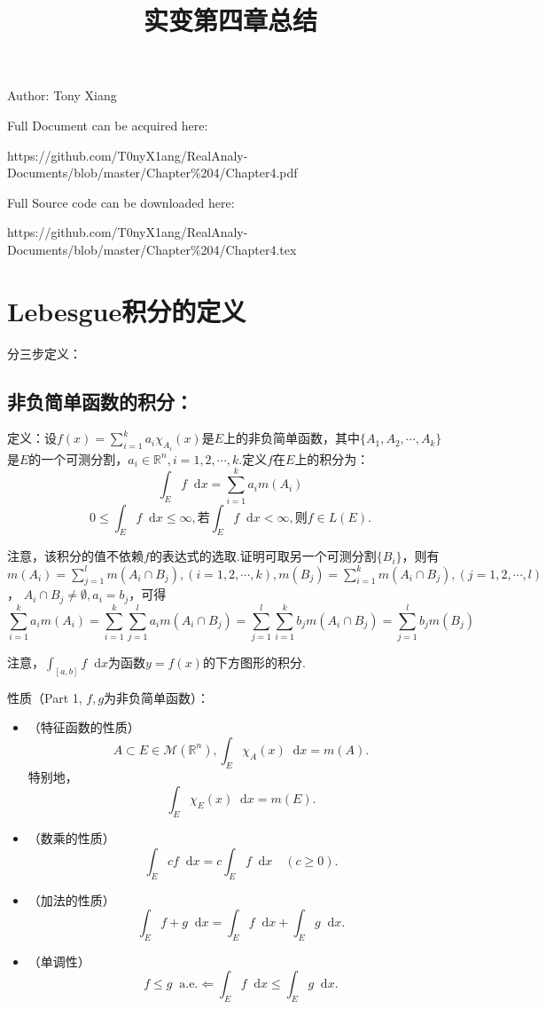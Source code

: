 \documentclass[bwprint, withoutpreface]{cumcmthesis}
\title{实变第四章总结}
\newcommand*{\dif}{\mathop{}\!\mathrm{d}}
\begin{document}
\maketitle
\noindent Author: Tony Xiang

\noindent Full Document can be acquired here: 

\noindent https://github.com/T0nyX1ang/RealAnaly-Documents/blob/master/Chapter\%204/Chapter4.pdf

\noindent Full Source code can be downloaded here:

\noindent https://github.com/T0nyX1ang/RealAnaly-Documents/blob/master/Chapter\%204/Chapter4.tex

\section{Lebesgue积分的定义}
分三步定义：
\subsection{非负简单函数的积分：}
\indent 定义：设$f(x) = \sum_{i = 1}^{k}{a_i\chi_{A_i}(x)}$是$E$上的非负简单函数，其中$\{A_1, A_2, \cdots, A_k\}$是$E$的一个可测分割，$a_i \in \mathbb{R}^n, i = 1, 2, \cdots, k$.定义$f$在$E$上的积分为：
\begin{equation*}
	\int_E{f} \dif x = \sum_{i = 1}^{k}{a_i m(A_i)}
\end{equation*}
\begin{equation*}
	0 \leqslant \int_E{f} \dif x \leqslant \infty, \mbox{若} \int_E{f} \dif x < \infty, \mbox{则}f \in L(E).
\end{equation*}

注意，该积分的值不依赖$f$的表达式的选取.证明可取另一个可测分割$\{B_i\}$，则有$m(A_i) = \sum_{j = 1}^{l}{m(A_i \cap B_j)}, (i = 1, 2, \cdots, k), m(B_j) = \sum_{i = 1}^{k}{m(A_i \cap B_j)}, (j = 1, 2, \cdots, l)$， $A_i \cap B_j \neq \emptyset, a_i = b_j$，可得 \[ \sum_{i = 1}^{k} a_i m(A_i) = \sum_{i = 1}^{k}{\sum_{j = 1}^{l}{a_i m(A_i \cap B_j)}} = \sum_{j = 1}^{l}{\sum_{i = 1}^{k}{b_j m(A_i \cap B_j)}} = \sum_{j = 1}^{l}{b_j m(B_j)} \]

注意，$\int_{[a, b]} f \dif x$为函数$y= f(x)$的下方图形的积分.

性质（Part 1, $f, g$为非负简单函数）：
\begin{itemize}[itemindent=2em]
	\item（特征函数的性质） \[ A \subset E \in \mathcal{M}(\mathbb{R}^n), \int_E \chi_A(x) \dif x = m(A). \]特别地，\[ \int_E \chi_E(x) \dif x = m(E). \]
	\item（数乘的性质） \[ \int_E cf \dif x = c \int_E f \dif x \quad (c \geqslant 0). \]
	\item（加法的性质） \[ \int_E f + g \dif x = \int_E f \dif x + \int_E g \dif x. \]
	\item（单调性）\[ f \leqslant g \mathop{} \! \mathrm{a.e.} \Leftarrow \int_E f \dif x \leqslant \int_E g \dif x. \]
\end{itemize}
\end{document}
